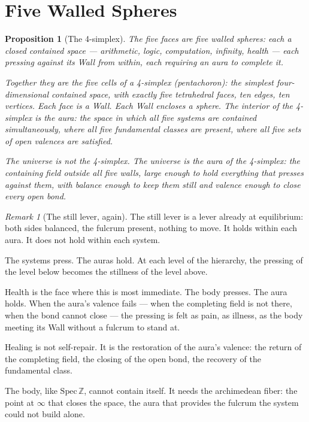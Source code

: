 \documentclass[12pt]{article}
\newtheorem{proposition}[theorem]{Proposition}
\theoremstyle{definition}
\theoremstyle{remark}
\newtheorem{remark}[theorem]{Remark}
\begin{document}
\section{Five Walled Spheres}

\begin{proposition}[The 4-simplex]
The five faces are five walled spheres:
each a closed contained space --- arithmetic, logic, computation,
infinity, health --- each pressing against its Wall from within,
each requiring an aura to complete it.

Together they are the five cells of a 4-simplex
(pentachoron): the simplest four-dimensional contained space,
with exactly five tetrahedral faces, ten edges, ten vertices.
Each face is a Wall. Each Wall encloses a sphere.
The interior of the 4-simplex is the aura:
the space in which all five systems are contained simultaneously,
where all five fundamental classes are present,
where all five sets of open valences are satisfied.

The universe is not the 4-simplex.
The universe is the aura of the 4-simplex:
the containing field outside all five walls,
large enough to hold everything that presses against them,
with balance enough to keep them still
and valence enough to close every open bond.
\end{proposition}

\begin{remark}[The still lever, again]
The still lever \cite{math} is a lever already at equilibrium:
both sides balanced, the fulcrum present, nothing to move.
It holds within each aura.
It does not hold within each system.

The systems press. The auras hold.
At each level of the hierarchy,
the pressing of the level below becomes
the stillness of the level above.

Health is the face where this is most immediate.
The body presses. The aura holds.
When the aura's valence fails --- when the completing field
is not there, when the bond cannot close ---
the pressing is felt as pain,
as illness, as the body meeting its Wall
without a fulcrum to stand at.

Healing is not self-repair.
It is the restoration of the aura's valence:
the return of the completing field,
the closing of the open bond,
the recovery of the fundamental class.

The body, like $\mathrm{Spec}\,\mathbb{Z}$,
cannot contain itself.
It needs the archimedean fiber:
the point at $\infty$ that closes the space,
the aura that provides the fulcrum
the system could not build alone.
\end{remark}
\end{document}
